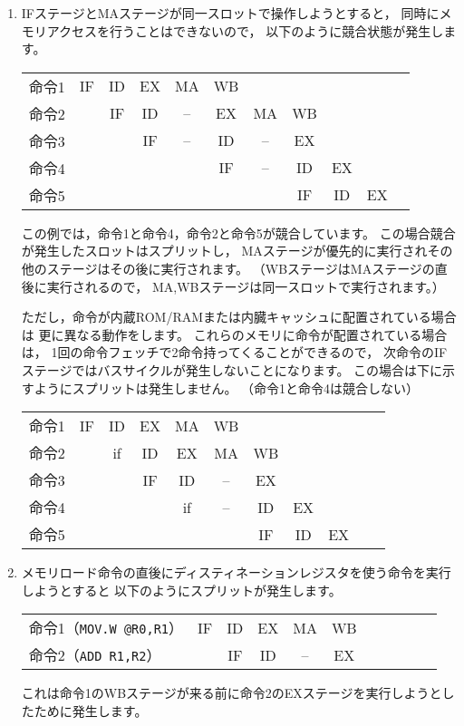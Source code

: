\documentclass[a4j,10pt,fleqn]{jsarticle}
\begin{document}
\begin{enumerate}
\item IFステージとMAステージが同一スロットで操作しようとすると，
    同時にメモリアクセスを行うことはできないので，
    以下のように競合状態が発生します。
    \begin{center}\begin{tabular}{r|c|c|c|cc|cc|c|cc}
    命令1 & IF & ID & EX & MA & WB &    &    &    &    &    \\
    命令2 &    & IF & ID & -- & EX & MA & WB &    &    &    \\
    命令3 &    &    & IF & -- & ID & -- & EX &    &    &    \\
    命令4 &    &    &    &    & IF & -- & ID & EX &    &    \\
    命令5 &    &    &    &    &    &    & IF & ID & EX &    \\
    \end{tabular}\end{center}
    この例では，命令1と命令4，命令2と命令5が競合しています。
    この場合競合が発生したスロットはスプリットし，
    MAステージが優先的に実行されその他のステージはその後に実行されます。
    （WBステージはMAステージの直後に実行されるので，
    MA,WBステージは同一スロットで実行されます。）
    \par ただし，命令が内蔵ROM/RAMまたは内臓キャッシュに配置されている場合は
    更に異なる動作をします。
    これらのメモリに命令が配置されている場合は，
    1回の命令フェッチで2命令持ってくることができるので，
    次命令のIFステージではバスサイクルが発生しないことになります。
    この場合は下に示すようにスプリットは発生しません。
    （命令1と命令4は競合しない）
    \begin{center}\begin{tabular}{r|c|c|c|c|cc|c|ccc}
    命令1 & IF & ID & EX & MA & WB &    &    &    &    &    \\
    命令2 &    & if & ID & EX & MA & WB &    &    &    &    \\
    命令3 &    &    & IF & ID & -- & EX &    &    &    &    \\
    命令4 &    &    &    & if & -- & ID & EX &    &    &    \\
    命令5 &    &    &    &    &    & IF & ID & EX &    &    \\
    \end{tabular}\end{center}

\item メモリロード命令の直後にディスティネーションレジスタを使う命令を実行しようとすると
    以下のようにスプリットが発生します。
    \begin{center}\begin{tabular}{l|c|c|c|cc|ccccc}
    命令1（\texttt{MOV.W @R0,R1}） & IF & ID & EX & MA & WB &    &    &    &    &    \\
    命令2（\texttt{ADD R1,R2}）    &    & IF & ID & -- & EX &    &    &    &    &    \\
    \end{tabular}\end{center}
    これは命令1のWBステージが来る前に命令2のEXステージを実行しようとしたために発生します。

\end{enumerate}
\end{document}

